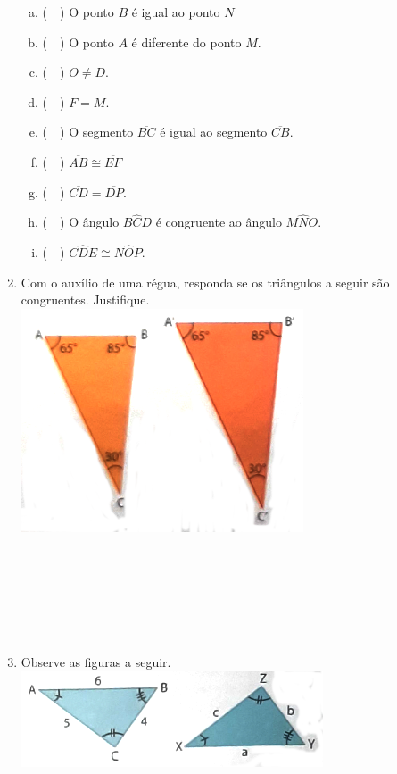 \documentclass[a4paper,14pt]{article}
\begin{document}
\begin{multicols}{2}
\begin{enumerate}
\begin{enumerate}[a)]
				\item (~~) O ponto $B$ é igual ao ponto $N$
				\item (~~) O ponto $A$ é diferente do ponto $M$.
				\item (~~) $O \neq D$.
				\item (~~) $F = M$.
				\item (~~) O segmento $\overline{BC}$ é igual ao segmento $\overline{CB}$.
				\item (~~) $\overline{AB} \cong \overline{EF}$
				\item (~~) $\overline{CD} = \overline{DP}$.
				\item (~~) O ângulo $B\hat{C}D$ é congruente ao ângulo $M\hat{N}O$.
				\item (~~) $C\hat{D}E \cong N\hat{O}P.$
			\end{enumerate}
			\item Com o auxílio de uma régua, responda se os triângulos a seguir são congruentes. Justifique. \\
			\includegraphics[width=1\linewidth]{6FMA108_imagens/imagem2}
			\\\\\\\\\\\\\\
			\item Observe as figuras a seguir. \\
			\includegraphics[width=1\linewidth]{6FMA108_imagens/imagem3}

\end{enumerate}
\end{multicols}
\end{document}
